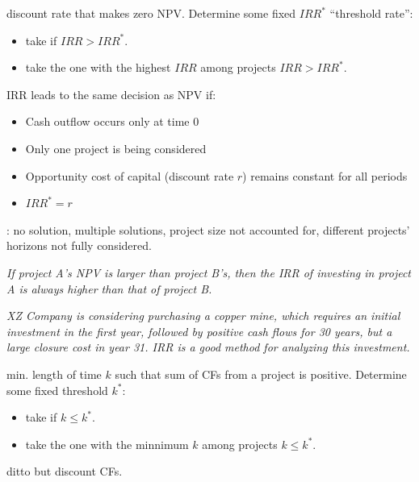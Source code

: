  discount rate that makes zero NPV.
Determine some fixed $IRR^*$ \ie ``threshold rate'':
\begin{itemize}
    \item {} take if $IRR > IRR^*$.
    \item {} take the one with the highest $IRR$ among projects $IRR > IRR^*$.
\end{itemize}
IRR leads to the same decision as NPV if:
\begin{itemize}
    \item Cash outflow occurs only at time 0
    \item Only one project is being considered
    \item Opportunity cost of capital (discount rate $r$) remains constant for all periods
    \item $IRR^* = r$
\end{itemize}

: no solution, multiple solutions, project size not accounted for, different projects' horizons
not fully considered.

\textit{If project A's NPV is larger than project B's, then the IRR of investing in project A is always higher than that
of project B.}

\textit{XZ Company is considering purchasing a copper mine, which requires an initial investment in the first year,
followed by positive cash flows for 30 years, but a large closure cost in year 31. IRR is a good method for analyzing
this investment.}

 min. length of time $k$ such that sum of CFs from a project is positive.
 Determine some fixed threshold $k^*$:
\begin{itemize}
    \item {} take if $k \le k^*$.
    \item {} take the one with the minnimum $k$ among projects $k \le k^*$.
\end{itemize}

 ditto but discount CFs.

